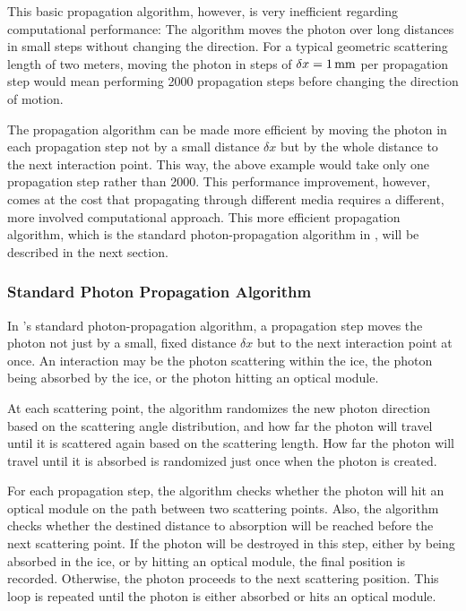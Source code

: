 This basic propagation algorithm, however, is very inefficient regarding
computational performance: The algorithm moves the photon over long
distances in small steps without changing the direction. For a typical
geometric scattering length of two meters, moving the photon in steps of
\(\delta x = 1\text{\,mm}\) per propagation step would mean performing 2000
propagation steps before changing the direction of motion.

The propagation algorithm can be made more efficient by moving the
photon in each propagation step not by a small distance \(\delta x\) but
by the whole distance to the next interaction point. This way, the above
example would take only one propagation step rather than 2000. This
performance improvement, however, comes at the cost that propagating
through different media requires a different, more involved
computational approach. This more efficient propagation algorithm, which
is the standard photon-propagation algorithm in \icecube, will be
described in the next section.

\subsubsection{Standard Photon Propagation Algorithm}
\label{sec:standardphotonpropagationalgorithm}

\label{sec:standard_photon_propagation_algorithm}
\label{sec:standard_clsim}

In \icecube's standard photon-propagation algorithm, a propagation step
moves the photon not just by a small, fixed distance \(\delta x\) but to
the next interaction point at once. An interaction may be the photon
scattering within the ice, the photon being absorbed by the ice, or the
photon hitting an optical module. \cite{clsimsource, ppcpaper}

At each scattering point, the algorithm randomizes the new photon
direction based on the scattering angle distribution, and how far the
photon will travel until it is scattered again based on the scattering
length. How far the photon will travel until it is absorbed is
randomized just once when the photon is created.

For each propagation step, the algorithm checks whether the photon will
hit an optical module on the path between two scattering points. Also,
the algorithm checks whether the destined distance to absorption will be
reached before the next scattering point. If the photon will be
destroyed in this step, either by being absorbed in the ice, or by
hitting an optical module, the final position is recorded. Otherwise,
the photon proceeds to the next scattering position. This loop is
repeated until the photon is either absorbed or hits an optical module.
\cite{ppcpaper}

